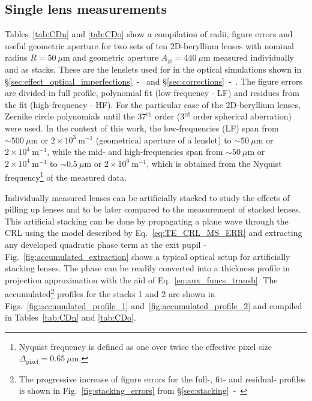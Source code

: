 \begin{refsection}
\subsection{Single lens measurements}\label{sec:single_lens}

Tables~\ref{tab:CDn} and \ref{tab:CDo} show a compilation of radii, figure errors and useful geometric aperture for two sets of ten 2D-beryllium lenses with nominal radius $R=50~\mu\text{m}$ and geometric aperture $A_{\diameter}=440~\mu\text{m}$ measured individually and as stacks. These are the lenslets used for in the optical simulations shown in \S\ref{sec:effect_optical_imperfections}~-~\textit{} and \S\ref{sec:corrections}~-~\textit{}. The figure errors are divided in full profile, polynomial fit (low frequency - LF) and residues from the fit (high-frequency - HF). For the particular case of the 2D-beryllium lenses, Zernike circle polynomials until the 37$^\text{th}$ order (3$^\text{rd}$ order spherical aberration) were used. In the context of this work, the low-frequencies (LF) span from $\sim500~\mu$m or $2\times10^{3}~\text{m}^{-1}$ (geometrical aperture of a lenslet) to $\sim50~\mu$m or $2\times10^{4}~\text{m}^{-1}$, while the mid- and high-frequencies span from $\sim50~\mu$m or $2\times10^{4}~\text{m}^{-1}$ to $\sim0.5~\mu$m or $2\times10^{6}~\text{m}^{-1}$, which is obtained from the Nyquist frequency\footnote{Nyquist frequency is defined as one over twice the effective pixel size $\Delta_\text{pixel}=0.65~\mu$m.} of the measured data.

Individually measured lenses can be artificially stacked to study the effects of pilling up lenses and to be later compared to the measurement of stacked lenses. This artificial stacking can be done by propagating a plane wave through the CRL using the model described by Eq.~\ref{eq:TE_CRL_MS_ERR} and extracting any developed quadratic phase term at the exit pupil - Fig.~\ref{fig:accumulated_extraction} shows a typical optical setup for artificially stacking lenses. The phase can be readily converted into a thickness profile in projection approximation with the aid of Eq.~\ref{eq:aux_funcs_transb}. The accumulated\footnote{The progressive increase of figure errors for the full-, fit- and residual- profiles is shown in Fig.~\ref{fig:stacking_errors} from \S\ref{sec:stacking}~-~\textit{}} profiles for the stacks 1 and 2 are shown in Figs.~\ref{fig:accumulated_profile_1} and~\ref{fig:accumulated_profile_2} and compiled in Tables~\ref{tab:CDn} and \ref{tab:CDo}.  


\end{refsection}
